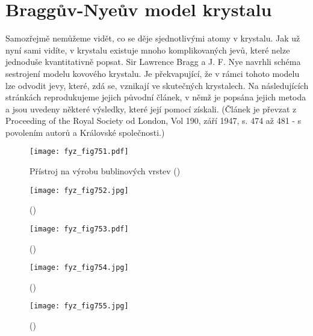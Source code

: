 {  \section{Braggův-Nyeův model krystalu}\label{fyz:IIchapXXXsecIX}
    Samozřejmě nemůžeme vidět, co se děje sjednotlivými atomy v krystalu. Jak už nyní sami vidíte, 
    v krystalu existuje mnoho komplikovaných jevů, které nelze jednoduše kvantitativně popsat. Sir 
    Lawrence Bragg a J. F. Nye navrhli schéma sestrojení modelu kovového krystalu. Je překvapující, 
    že v rámci tohoto modelu lze odvodit jevy, které, zdá se, vznikají ve skutečných krystalech. Na 
    následujících stránkách reprodukujeme jejich původní článek, v němž je popsána jejich metoda a 
    jsou uvedeny některé výsledky, které její pomocí získali. (Článek je převzat z Proceeding of 
    the Royal Society od London, Vol 190, září 1947, s. 474 až 481 - s povolením autorů a Královské 
    společnosti.)

    \begin{figure}[ht!] %
      \centering
      \texttt{[image: fyz\_fig751.pdf]}
      \caption{Přístroj na výrobu bublinových vrstev
               (\cite[s.~557]{Feynman02})}
      \label{fyz_fig751}
    \end{figure}

    \begin{figure}[ht!] %
      \centering
      \texttt{[image: fyz\_fig752.jpg]}
      \caption{
               (\cite[s.~707]{Feynman02})}
      \label{fyz_fig752}
    \end{figure}

    \begin{figure}[ht!] %
      \centering
      \texttt{[image: fyz\_fig753.pdf]}
      \caption{
               (\cite[s.~707]{Feynman02})}
      \label{fyz_fig753}
    \end{figure}



    \begin{figure}[ht!] %
      \centering
      \texttt{[image: fyz\_fig754.jpg]}
      \caption{
               (\cite[s.~707]{Feynman02})}
      \label{fyz_fig754}
    \end{figure}

    \begin{figure}[ht!] %
      \centering
      \texttt{[image: fyz\_fig755.jpg]}
      \caption{
               (\cite[s.~707]{Feynman02})}
      \label{fyz_fig755}
    \end{figure}

}
